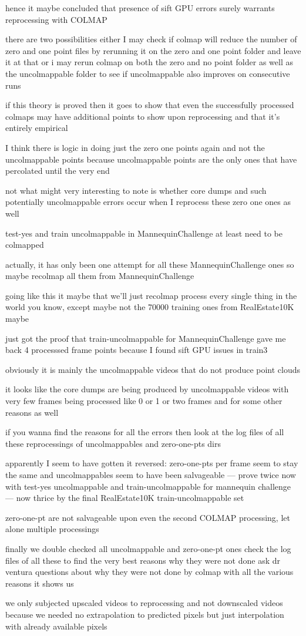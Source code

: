 hence it maybe concluded that presence of sift GPU errors surely warrants reprocessing with COLMAP

there are two possibilities 
either I may check if colmap will reduce the number of zero and one point files by rerunning it on the zero and one point folder and leave it at that 
or i may rerun colmap on both the zero and no point folder as well as the uncolmappable folder to see if uncolmappable also improves on consecutive runs 

if this theory is proved then it goes to show that even the successfully processed colmaps may have additional points to show upon reprocessing and that it's entirely empirical

I think there is logic in doing just the zero one points again and not the uncolmappable points because uncolmappable points are the only ones that have percolated until the very end

not what might very interesting to note is whether core dumps and such potentially uncolmappable errors occur when I reprocess these zero one ones as well

test-yes and train uncolmappable in MannequinChallenge at least need to be colmapped

actually, it has only been one attempt for all these MannequinChallenge ones so maybe recolmap all them from MannequinChallenge

going like this it maybe that we'll just recolmap process every single thing in the world you know, except maybe not the 70000 training ones from RealEstate10K maybe

just got the proof that train-uncolmappable for MannequinChallenge gave me back 4 processsed frame points because I found sift GPU issues in train3

obviously it is mainly the uncolmappable videos that do not produce point clouds

it looks like the core dumps are being produced by uncolmappable videos with very few frames being processed
like 0 or 1 or two frames and for some other reasons as well

if you wanna find the reasons for all the errors then look at the log files of all these reprocessings of uncolmappables and zero-one-pts dirs 

apparently I seem to have gotten it reversed: zero-one-pts per frame seem to stay the same and uncolmappables seem to have been salvageable --- prove twice now with test-yes uncolmappable and train-uncolmappable for mannequin challenge --- now thrice by the final RealEstate10K train-uncolmappable set

zero-one-pt are not salvageable upon even the second COLMAP processing, let alone multiple processings

finally we double checked all uncolmappable and zero-one-pt ones
check the log files of all these to find the very best reasons why they were not done
ask dr ventura questions about why they were not done by colmap with all the various reasons it shows us

we only subjected upscaled videos to reprocessing and not downscaled videos because we needed no extrapolation to predicted pixels but just interpolation with already available pixels  
